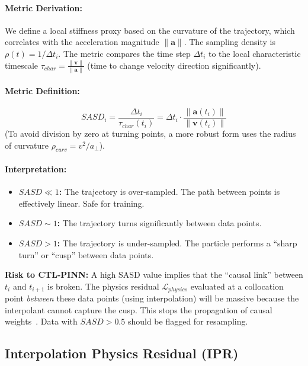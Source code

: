 \documentclass[11pt, a4paper]{article}
\newcommand{\vect}[1]{\mathbf{#1}} %
\newcommand{\norm}[1]{\left\lVert#1\right\rVert} %
\begin{document}
\paragraph{Metric Derivation:}
We define a local stiffness proxy based on the curvature of the trajectory, which correlates with the acceleration magnitude $\norm{\vect{a}}$. The sampling density is $\rho(t) = 1/\Delta t_i$.
The metric compares the time step $\Delta t_i$ to the local characteristic timescale $\tau_{char} = \frac{\norm{\vect{v}}}{\norm{\vect{a}}}$ (time to change velocity direction significantly).

\paragraph{Metric Definition:}
\begin{equation}
    SASD_i = \frac{\Delta t_i}{\tau_{char}(t_i)} = \Delta t_i \cdot \frac{\norm{\vect{a}(t_i)}}{\norm{\vect{v}(t_i)}}
\end{equation}
(To avoid division by zero at turning points, a more robust form uses the radius of curvature $\rho_{curv} = v^2/a_{\perp}$).

\paragraph{Interpretation:}
\begin{itemize}
    \item \textbf{$SASD \ll 1$:} The trajectory is over-sampled. The path between points is effectively linear. Safe for training.
    \item \textbf{$SASD \sim 1$:} The trajectory turns significantly between data points.
    \item \textbf{$SASD > 1$:} The trajectory is under-sampled. The particle performs a ``sharp turn'' or ``cusp'' between data points.
\end{itemize}

\textbf{Risk to CTL-PINN:} A high SASD value implies that the ``causal link'' between $t_i$ and $t_{i+1}$ is broken. The physics residual $\mathcal{L}_{physics}$ evaluated at a collocation point \textit{between} these data points (using interpolation) will be massive because the interpolant cannot capture the cusp. This stops the propagation of causal weights~\cite{ref10}. Data with $SASD > 0.5$ should be flagged for resampling.

\subsection{Interpolation Physics Residual (IPR)}
\end{document}
